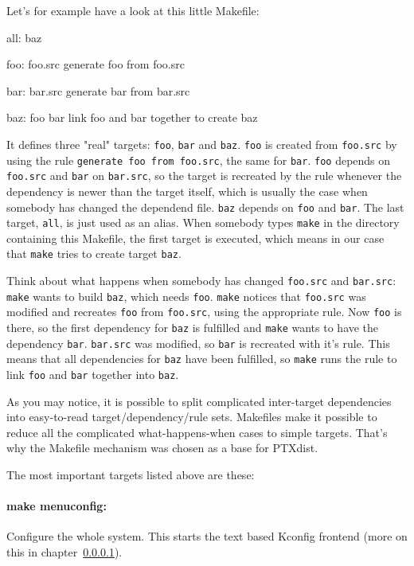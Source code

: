 Let's for example have a look at this little Makefile: 
\begin{code}
all: baz

foo: foo.src
	generate foo from foo.src

bar: bar.src
	generate bar from bar.src 
	
baz: foo bar
	link foo and bar together to create baz
\end{code}

It defines three "real" targets: \texttt{foo}, \texttt{bar} and
\texttt{baz}. \texttt{foo} is created from \texttt{foo.src} by using the
rule \texttt{generate foo from foo.src}, the same for \texttt{bar}.
\texttt{foo} depends on \texttt{foo.src} and \texttt{bar} on
\texttt{bar.src}, so the target is recreated by the rule whenever the
dependency is newer than the target itself, which is usually the case
when somebody has changed the dependend file. \texttt{baz} depends on
\texttt{foo} and \texttt{bar}. The last target, \texttt{all}, is just
used as an alias. When somebody types \texttt{make} in the directory
containing this Makefile, the first target is executed, which means in
our case that \texttt{make} tries to create target \texttt{baz}.

Think about what happens when somebody has changed \texttt{foo.src} and
\texttt{bar.src}: \texttt{make} wants to build \texttt{baz}, which needs
\texttt{foo}. \texttt{make} notices that \texttt{foo.src} was modified
and recreates \texttt{foo} from \texttt{foo.src}, using the appropriate
rule. Now \texttt{foo} is there, so the first dependency for
\texttt{baz} is fulfilled and \texttt{make} wants to have the dependency
\texttt{bar}. \texttt{bar.src} was modified, so \texttt{bar} is
recreated with it's rule. This means that all dependencies for
\texttt{baz} have been fulfilled, so \texttt{make} runs the rule to link
\texttt{foo} and \texttt{bar} together into \texttt{baz}. 

As you may notice, it is possible to split complicated inter-target
dependencies into easy-to-read target/dependency/rule sets. Makefiles
make it possible to reduce all the complicated what-happens-when cases
to simple targets. That's why the Makefile mechanism was chosen as a
base for PTXdist. 

The most important targets listed above are these: 

\paragraph{make menuconfig:} Configure the whole system. This starts the
text based Kconfig frontend (more on this in chapter~\ref{}). 

